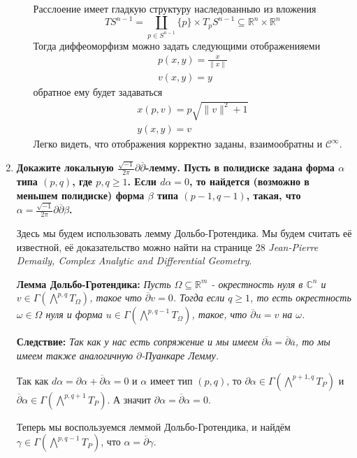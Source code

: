 \documentclass{article}
\begin{document}
\begin{enumerate}
\begin{enumerate}
                Расслоение имеет гладкую структуру наследованныю из вложения
                \[TS^{n-1}=\coprod_{p\in S^{n-1}}\{p\}\times T_pS^{n-1}\subseteq\mathbb R^n\times\mathbb R^n\]
                Тогда диффеоморфизм можно задать следующими отображенияеми
                \begin{align*}
                    p(x,y)=\frac{x}{\|x\|}\\
                    v(x,y)=y
                \end{align*}
                обратное ему будет задаваться
                \begin{align*}
                    x(p,v)=p\sqrt{\|v\|^2+1}\\
                    y(x,y)=v
                \end{align*}
                Легко видеть, что отображения корректно заданы, взаимообратны и
                $\mathcal C^\infty$.
        \end{enumerate}

    \item \textbf{Докажите локальную $\frac{\sqrt{−1}}{2\pi}\partial\overline\partial$-лемму.
        Пусть в полидиске задана форма $\alpha$ типа $(p,q)$, где $p,q\geq 1$.
        Если $dα=0$, то найдется (возможно в меньшем полидиске) форма $\beta$
        типа $(p−1,q−1)$, такая, что $\alpha=\frac{\sqrt{−1}}{2π}\partial\overline
        \partial\beta$.}

        Здесь мы будем использовать лемму Дольбо-Гротендика. Мы будем считать
        её известной, её доказательство можно найти на странице 28 
        \textit{Jean-Pierre Demaily, Complex Analytic and Differential Geometry}.

        \textbf{Лемма Дольбо-Гротендика:} \textit{Пусть $\Omega\subseteq\mathbb R^m$
        - окрестность нуля в $\mathbb C^n$ и $v\in\Gamma(\bigwedge^{p,q}T_\Omega)$,
        такое что $\overline\partial v=0$. Тогда если $q\geq 1$, то есть окрестность
        $\omega\in\Omega$ нуля и форма $u\in\Gamma(\bigwedge^{p,q-1}T_\Omega)$,
        такое, что $\overline\partial u=v$ на $\omega$.
        }

        \textbf{Следствие:} \textit{Так как у нас есть сопряжение и мы имеем $\overline{
        \partial a}=\overline\partial\overline a$, то мы имеем также аналогичную
        $\partial$-Пуанкаре Лемму.}

        Так как $d\alpha=\partial\alpha+\overline\partial\alpha=0$ и $\alpha$
        имеет тип $(p,q)$, то $\partial\alpha\in\Gamma(\bigwedge^{p+1,q}T_P)$
        и $\overline\partial\alpha\in\Gamma(\bigwedge^{p,q+1}T_P)$. А значит
        $\partial\alpha=\overline\partial\alpha=0$.

        Теперь мы воспользуемся леммой Дольбо-Гротендика, и найдём $\gamma\in
        \Gamma(\bigwedge^{p,q-1}T_P)$, что $\alpha=\overline\partial\gamma$.        
\end{enumerate}
\end{document}
